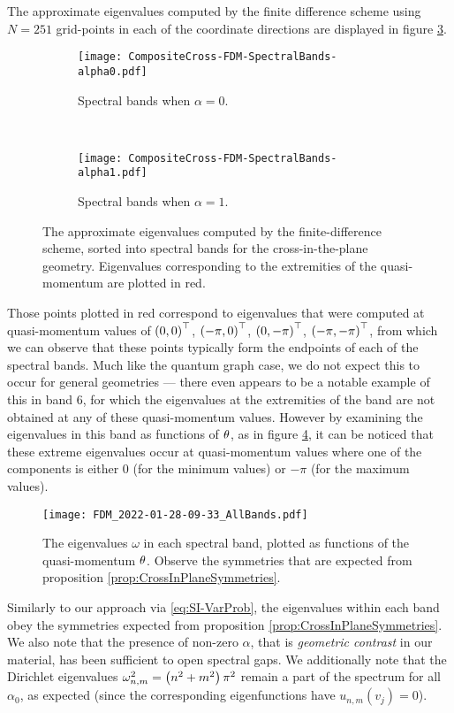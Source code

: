 The approximate eigenvalues computed by the finite difference scheme using $N=251$ grid-points in each of the coordinate directions are displayed in figure \ref{fig:CompositeCross-FDM-SpectralBands}.
\begin{figure}[b!]
	\centering
	\begin{subfigure}[t]{0.45\textwidth}
		\centering
		\texttt{[image: CompositeCross-FDM-SpectralBands-alpha0.pdf]}
		\caption[]{\label{fig:CompositeCross-FDM-SpectralBands-alpha0} Spectral bands when $\alpha=0$.}
	\end{subfigure}
	~
	\begin{subfigure}[t]{0.45\textwidth}
		\centering
		\texttt{[image: CompositeCross-FDM-SpectralBands-alpha1.pdf]}
		\caption[]{\label{fig:CompositeCross-FDM-SpectralBands-alpha1} Spectral bands when $\alpha=1$.}
	\end{subfigure}
	\caption[Spectral bands of \eqref{eq:SI-WaveEqn}, computed via solution of the problem \eqref{eq:SI-StrongForm}.]{\label{fig:CompositeCross-FDM-SpectralBands} The approximate eigenvalues computed by the finite-difference scheme, sorted into spectral bands for the cross-in-the-plane geometry. Eigenvalues corresponding to the extremities of the quasi-momentum are plotted in red.}
\end{figure}
Those points plotted in red correspond to eigenvalues that were computed at quasi-momentum values of $\left( 0,0 \right)^\top$, $\left( -\pi,0 \right)^\top$, $\left( 0,-\pi \right)^\top$, $\left( -\pi,-\pi \right)^\top$, from which we can observe that these points typically form the endpoints of each of the spectral bands.
Much like the quantum graph case, we do not expect this to occur for general geometries --- there even appears to be a notable example of this in band 6, for which the eigenvalues at the extremities of the band are not obtained at any of these quasi-momentum values.
However by examining the eigenvalues in this band as functions of $\theta$, as in figure \ref{fig:FDM_2022-01-28-09-33_AllBands}, it can be noticed that these extreme eigenvalues occur at quasi-momentum values where one of the components is either 0 (for the minimum values) or $-\pi$ (for the maximum values).
\begin{figure}[t!]
	\centering
	\texttt{[image: FDM\_2022-01-28-09-33\_AllBands.pdf]}
	\caption[Dispersion relations for the first 10 spectral bands of \eqref{eq:SI-WaveEqn}, computed via solution of \eqref{eq:SI-StrongForm} with $\alpha=0$.]{\label{fig:FDM_2022-01-28-09-33_AllBands} The eigenvalues $\omega$ in each spectral band, plotted as functions of the quasi-momentum $\theta$. Observe the symmetries that are expected from proposition \ref{prop:CrossInPlaneSymmetries}.}
\end{figure}
Similarly to our approach via \eqref{eq:SI-VarProb}, the eigenvalues within each band obey the symmetries expected from proposition \ref{prop:CrossInPlaneSymmetries}.
We also note that the presence of non-zero $\alpha$, that is \emph{geometric contrast} in our material, has been sufficient to open spectral gaps.
We additionally note that the Dirichlet eigenvalues $\omega_{n,m}^2=\left( n^2+m^2 \right)\pi^2$ remain a part of the spectrum for all $\alpha_0$, as expected (since the corresponding eigenfunctions have $u_{n,m}(v_j)=0$).


